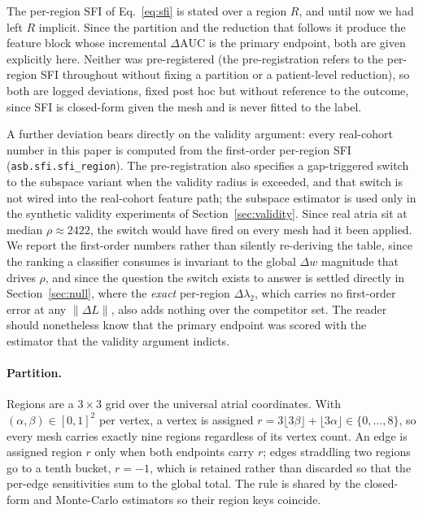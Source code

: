 \documentclass[11pt]{article}
\theoremstyle{definition}
\newcommand{\lam}{\lambda}
\newcommand{\rhoval}{\rho}
\newcommand{\dAUC}{\Delta\mathrm{AUC}}
\newcommand{\code}[1]{\texttt{#1}}
\begin{document}
The per-region SFI of Eq.~\eqref{eq:sfi} is stated over a region $R$, and until
now we had left $R$ implicit. Since the partition and the reduction that follows
it produce the feature block whose incremental $\dAUC$ is the primary endpoint,
both are given explicitly here. Neither was pre-registered (the pre-registration
refers to the per-region SFI throughout without fixing a partition or a
patient-level reduction), so both are logged deviations, fixed post hoc but
without reference to the outcome, since SFI is closed-form given the mesh and is
never fitted to the label.

A further deviation bears directly on the validity argument: every real-cohort
number in this paper is computed from the first-order per-region SFI
(\code{asb.sfi.sfi\_region}). The pre-registration also specifies a
gap-triggered switch to the subspace variant when the validity radius is
exceeded, and that switch is not wired into the real-cohort feature path; the
subspace estimator is used only in the synthetic validity experiments of
Section~\ref{sec:validity}. Since real atria sit at median
$\rhoval\approx2422$, the switch would have fired on every mesh had it been
applied. We report the first-order numbers rather than silently re-deriving the
table, since the ranking a classifier consumes is invariant to the global
$\Delta w$ magnitude that drives $\rhoval$, and since the question the switch
exists to answer is settled directly in Section~\ref{sec:null}, where the
\emph{exact} per-region $\Delta\lam_2$, which carries no first-order error at
any $\lVert\Delta L\rVert$, also adds nothing over the competitor set. The
reader should nonetheless know that the primary endpoint was scored with the
estimator that the validity argument indicts.

\paragraph{Partition.} Regions are a $3\times3$ grid over the universal atrial
coordinates. With $(\alpha,\beta)\in[0,1]^2$ per vertex, a vertex is assigned
$r=3\lfloor 3\beta\rfloor+\lfloor 3\alpha\rfloor \in\{0,\dots,8\}$, so every mesh
carries exactly nine regions regardless of its vertex count. An edge is
assigned region $r$ only when both endpoints carry $r$; edges straddling two
regions go to a tenth bucket, $r=-1$, which is retained rather than discarded so
that the per-edge sensitivities sum to the global total. The rule is shared by
the closed-form and Monte-Carlo estimators so their region keys coincide.
\end{document}
